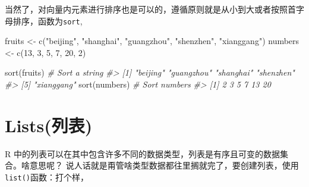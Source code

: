 \documentclass[
]{book}
\newenvironment{Shaded}{\begin{snugshade}}{\end{snugshade}}
\newcommand{\AttributeTok}[1]{\textcolor[rgb]{0.77,0.63,0.00}{#1}}
\newcommand{\CommentTok}[1]{\textcolor[rgb]{0.56,0.35,0.01}{\textit{#1}}}
\newcommand{\ConstantTok}[1]{\textcolor[rgb]{0.00,0.00,0.00}{#1}}
\newcommand{\DecValTok}[1]{\textcolor[rgb]{0.00,0.00,0.81}{#1}}
\newcommand{\FunctionTok}[1]{\textcolor[rgb]{0.00,0.00,0.00}{#1}}
\newcommand{\NormalTok}[1]{#1}
\newcommand{\OtherTok}[1]{\textcolor[rgb]{0.56,0.35,0.01}{#1}}
\newcommand{\StringTok}[1]{\textcolor[rgb]{0.31,0.60,0.02}{#1}}
\begin{document}
当然了，对向量内元素进行排序也是可以的，遵循原则就是从小到大或者按照首字母排序，函数为\texttt{sort},

\begin{Shaded}
\begin{Highlighting}[]
\NormalTok{fruits }\OtherTok{\textless{}{-}} \FunctionTok{c}\NormalTok{(}\StringTok{"beijing"}\NormalTok{, }\StringTok{"shanghai"}\NormalTok{, }\StringTok{"guangzhou"}\NormalTok{, }\StringTok{"shenzhen"}\NormalTok{, }\StringTok{"xianggang"}\NormalTok{)}
\NormalTok{numbers }\OtherTok{\textless{}{-}} \FunctionTok{c}\NormalTok{(}\DecValTok{13}\NormalTok{, }\DecValTok{3}\NormalTok{, }\DecValTok{5}\NormalTok{, }\DecValTok{7}\NormalTok{, }\DecValTok{20}\NormalTok{, }\DecValTok{2}\NormalTok{)}

\FunctionTok{sort}\NormalTok{(fruits)  }\CommentTok{\# Sort a string}
\CommentTok{\#\textgreater{} [1] "beijing"   "guangzhou" "shanghai"  "shenzhen" }
\CommentTok{\#\textgreater{} [5] "xianggang"}
\FunctionTok{sort}\NormalTok{(numbers) }\CommentTok{\# Sort numbers}
\CommentTok{\#\textgreater{} [1]  2  3  5  7 13 20}
\end{Highlighting}
\end{Shaded}

\hypertarget{listsux5217ux8868}{%
\section{Lists(列表)}\label{listsux5217ux8868}}

R 中的列表可以在其中包含许多不同的数据类型，列表是有序且可变的数据集合。啥意思呢？
说人话就是甭管啥类型数据都往里搁就完了，要创建列表，使用\texttt{list()}函数：打个样，

\begin{Shaded}
\end{Shaded}
\end{document}
